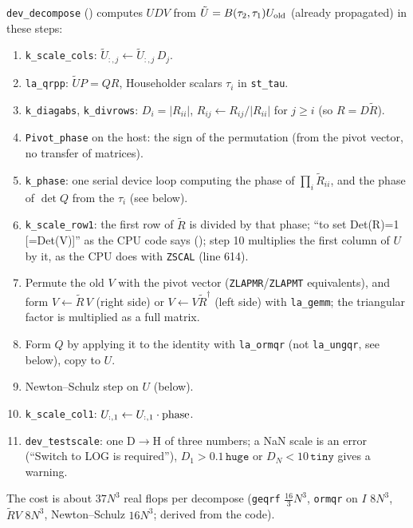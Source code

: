 \texttt{dev\_decompose} () computes $U D V$ from $\tilde U = B(\tau_2,\tau_1)U_{\rm old}$ (already propagated) in these steps:
\begin{enumerate}
\item \texttt{k\_scale\_cols}: $\tilde U_{:,j}\leftarrow \tilde U_{:,j}\,D_j$.
\item \texttt{la\_qrpp}: $\tilde U P = QR$, Householder scalars $\tau_i$ in \texttt{st\_tau}.
\item \texttt{k\_diagabs}, \texttt{k\_divrows}: $D_i=|R_{ii}|$, $R_{ij}\leftarrow R_{ij}/|R_{ii}|$ for $j\ge i$ (so $R=D\tilde R$).
\item \texttt{Pivot\_phase} on the host: the sign of the permutation (from the pivot vector, no transfer of matrices).
\item \texttt{k\_phase}: one serial device loop computing the phase of $\prod_i \tilde R_{ii}$, and the phase of $\det Q$ from the $\tau_i$ (see below).
\item \texttt{k\_scale\_row1}: the first row of $\tilde R$ is divided by that phase; ``to set Det(R)=1 [=Det(V)]'' as the CPU code says (); step 10 multiplies the first column of $U$ by it, as the CPU does with \texttt{ZSCAL} (line 614).
\item Permute the old $V$ with the pivot vector (\texttt{ZLAPMR}/\texttt{ZLAPMT} equivalents), and form $V\leftarrow\tilde R\,V$ (right side) or $V\leftarrow V\tilde R^\dagger$ (left side) with \texttt{la\_gemm}; the triangular factor is multiplied as a full matrix.
\item Form $Q$ by applying it to the identity with \texttt{la\_ormqr} (not \texttt{la\_ungqr}, see below), copy to $U$.
\item Newton--Schulz step on $U$ (below).
\item \texttt{k\_scale\_col1}: $U_{:,1}\leftarrow U_{:,1}\cdot{\rm phase}$.
\item \texttt{dev\_testscale}: one D$\to$H of three numbers; a NaN scale is an error (``Switch to LOG is required''), $D_1>0.1\,\texttt{huge}$ or $D_N<10\,\texttt{tiny}$ gives a warning.
\end{enumerate}
The cost is about $37N^3$ real flops per decompose (\texttt{geqrf} $\tfrac{16}{3}N^3$, \texttt{ormqr} on $I$ $8N^3$, $\tilde RV$ $8N^3$, Newton--Schulz $16N^3$; derived from the code).

